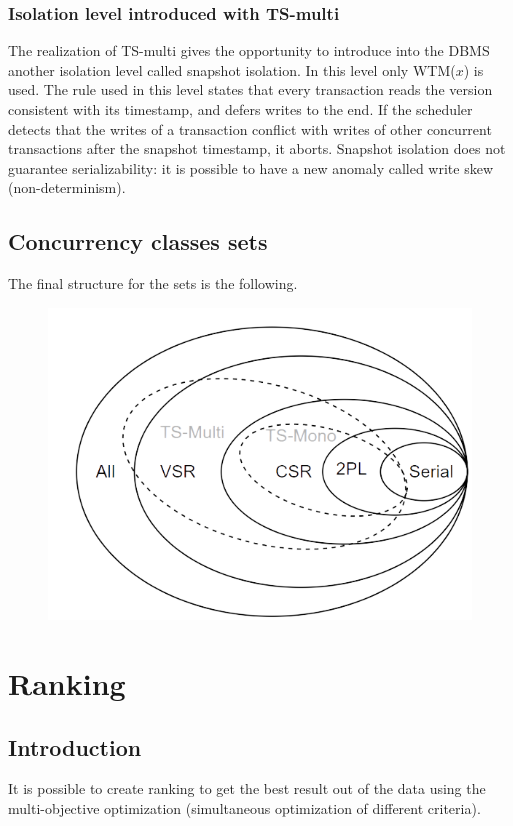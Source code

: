 \documentclass[12pt, a4paper]{report}
\begin{document}
    \subsection{Isolation level introduced with TS-multi}
    The realization of TS-multi gives the opportunity to introduce into the DBMS another isolation level called snapshot isolation. In this level only WTM($x$) is used. The rule 
    used in this level states that every transaction reads the version consistent with its timestamp, and defers writes to the end. If the scheduler detects that the writes of a
    transaction conflict with writes of other concurrent transactions after the snapshot timestamp, it aborts. Snapshot isolation does not guarantee serializability: it is possible 
    to have a new anomaly called write skew (non-determinism). 
    
    \section{Concurrency classes sets}
    The final structure for the sets is the following. 
    \begin{figure}[H]
        \centering
        \includegraphics[width=0.75\linewidth]{images/set.png}
    \end{figure}
    
\newpage 

\chapter{Ranking}
    \section{Introduction}
    It is possible to create ranking to get the best result out of the data using the multi-objective optimization (simultaneous optimization of different criteria). 
    
\end{document}
